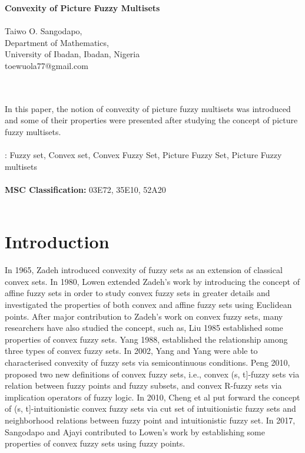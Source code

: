 \documentclass[12pt,letterpaper]{amsart}
\theoremstyle{plain}
\theoremstyle{definition}
\numberwithin{equation}{section}
\begin{document}
\begin{center}
{\textbf{{Convexity of Picture Fuzzy Multisets}}}\ \\ \ \\

{Taiwo O. Sangodapo},\\
Department of Mathematics,\\ University of Ibadan, Ibadan, Nigeria\\toewuola77@gmail.com
\end{center}
\ \\ \  \\

In this paper, the notion of convexity of picture fuzzy multisets was introduced and some of their properties were presented after studying the concept of picture fuzzy multisets. 
\; \\ \; \\


: Fuzzy set, Convex set, Convex Fuzzy Set, Picture Fuzzy Set, Picture Fuzzy multisets
\; \\ \; \\

\noindent \textbf{MSC Classification:} 03E72, 35E10, 52A20
\ \\ \ \\


\section{Introduction} In 1965, Zadeh \cite{z} introduced convexity of fuzzy sets as an extension of classical convex sets. In 1980, Lowen \cite{l} extended Zadeh's work by introducing the concept of affine fuzzy sets in order to study convex fuzzy sets in greater details and investigated the properties of both convex and affine fuzzy sets using Euclidean points. After major contribution to Zadeh's work on convex fuzzy sets, many researchers have also studied the concept, such as, Liu \cite{l2} 1985 established some properties of convex fuzzy sets. Yang \cite{y} 1988, established the relationship among three types of convex fuzzy sets. In 2002, Yang and Yang \cite{yy} were able to characterised convexity of fuzzy sets via semicontinuous conditions. Peng \cite{p} 2010, proposed two new definitions of convex fuzzy sets, i.e., convex (s, t]-fuzzy sets via relation between fuzzy points and fuzzy subsets, and convex R-fuzzy sets via implication operators of fuzzy logic. In 2010, Cheng et al \cite{c} put forward the concept of (s, t]-intuitionistic convex fuzzy sets via cut set of intuitionistic fuzzy sets and neighborhood relations between fuzzy point and intuitionistic fuzzy set. In 2017, Sangodapo and Ajayi \cite{sa1} contributed to Lowen's work by establishing some properties of convex fuzzy sets using fuzzy points.
\end{document}
